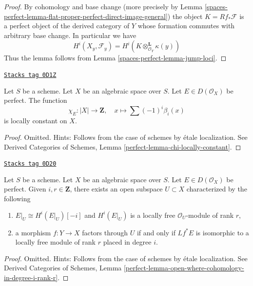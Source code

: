 \begin{proof}
By cohomology and base change (more precisely by
Lemma \ref{spaces-perfect-lemma-flat-proper-perfect-direct-image-general})
the object $K = Rf_*\mathcal{F}$ is a perfect object of the derived
category of $Y$ whose formation commutes with arbitrary base change.
In particular we have
$$
H^i(X_y, \mathcal{F}_y) = H^i(K \otimes_{\mathcal{O}_Y}^\mathbf{L} \kappa(y))
$$
Thus the lemma follows from Lemma \ref{spaces-perfect-lemma-jump-loci}.
\end{proof}

\begin{lemma}
\label{spaces-perfect-lemma-chi-locally-constant}
\href{https://stacks.math.columbia.edu/tag/0D1Z}{\texttt{Stacks tag 0D1Z}}

Let $S$ be a scheme. Let $X$ be an algebraic space over $S$.
Let $E \in D(\mathcal{O}_X)$ be perfect. The function
$$
\chi_E : |X| \longrightarrow \mathbf{Z},\quad
x \longmapsto \sum (-1)^i \beta_i(x)
$$
is locally constant on $X$.
\end{lemma}

\begin{proof}
Omitted. Hints:
Follows from the case of schemes by \'etale localization. See
Derived Categories of Schemes, Lemma \ref{perfect-lemma-chi-locally-constant}.
\end{proof}

\begin{lemma}
\label{spaces-perfect-lemma-open-where-cohomology-in-degree-i-rank-r}
\href{https://stacks.math.columbia.edu/tag/0D20}{\texttt{Stacks tag 0D20}}

Let $S$ be a scheme. Let $X$ be an algebraic space over $S$.
Let $E \in D(\mathcal{O}_X)$ be perfect.
Given $i, r \in \mathbf{Z}$, there exists an
open subspace $U \subset X$ characterized by the following
\begin{enumerate}
\item $E|_U \cong H^i(E|_U)[-i]$ and $H^i(E|_U)$ is a locally free
$\mathcal{O}_U$-module of rank $r$,
\item a morphism $f : Y \to X$ factors through $U$ if and only if
$Lf^*E$ is isomorphic to a locally free module of rank $r$
placed in degree $i$.
\end{enumerate}
\end{lemma}

\begin{proof}
Omitted. Hints:
Follows from the case of schemes by \'etale localization. See
Derived Categories of Schemes, Lemma
\ref{perfect-lemma-open-where-cohomology-in-degree-i-rank-r}.
\end{proof}

